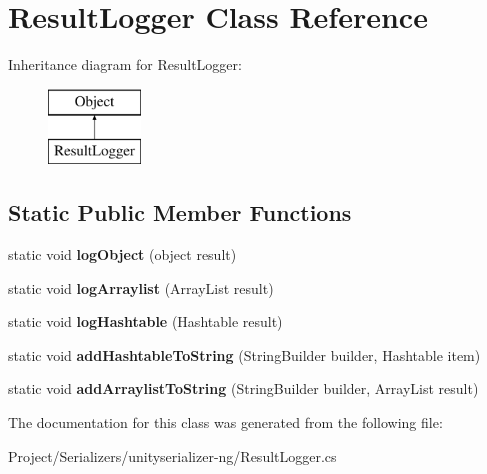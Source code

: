 \hypertarget{class_result_logger}{}\section{Result\+Logger Class Reference}
\label{class_result_logger}
Inheritance diagram for Result\+Logger\+:\begin{figure}[H]
\begin{center}
\leavevmode
\includegraphics[height=2.000000cm]{class_result_logger}
\end{center}
\end{figure}
\subsection*{Static Public Member Functions}
\begin{DoxyCompactItemize}
\item 
\mbox{\label{class_result_logger_af419bde152200fa5abcdde26ea10c7d8}} 
static void {\bfseries log\+Object} (object result)
\item 
\mbox{\label{class_result_logger_ac15653ab60b55f041711fcb2cbeeee42}} 
static void {\bfseries log\+Arraylist} (Array\+List result)
\item 
\mbox{\label{class_result_logger_af61803afb3b2bc905bd3e5643b2d893b}} 
static void {\bfseries log\+Hashtable} (Hashtable result)
\item 
\mbox{\label{class_result_logger_aebd3a60183173fd32fbcb84c9ca1cbc5}} 
static void {\bfseries add\+Hashtable\+To\+String} (String\+Builder builder, Hashtable item)
\item 
\mbox{\label{class_result_logger_af10a2cf057bfc480f11b179607748493}} 
static void {\bfseries add\+Arraylist\+To\+String} (String\+Builder builder, Array\+List result)
\end{DoxyCompactItemize}


The documentation for this class was generated from the following file\+:\begin{DoxyCompactItemize}
\item 
Project/\+Serializers/unityserializer-\/ng/Result\+Logger.\+cs\end{DoxyCompactItemize}
